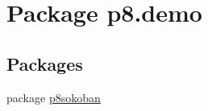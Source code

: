 \hypertarget{namespacep8_1_1demo}{}\section{Package p8.\+demo}
\label{namespacep8_1_1demo}
\subsection*{Packages}
\begin{DoxyCompactItemize}
\item 
package \hyperlink{namespacep8_1_1demo_1_1p8sokoban}{p8sokoban}
\end{DoxyCompactItemize}
